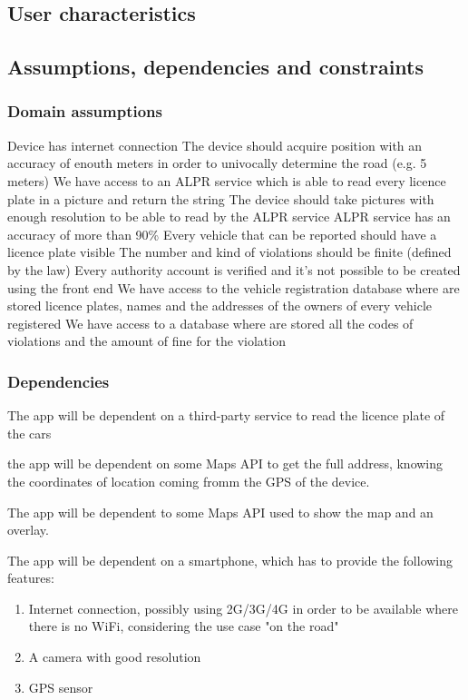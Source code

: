 \subsection{User characteristics }

\subsection{Assumptions, dependencies and constraints}
\subsubsection{Domain assumptions}

\begin{enumerate}
  Device has internet connection
 The device should acquire position with an accuracy of enouth meters in order to univocally determine the road (e.g. 5 meters)
\dom{} We have access to an ALPR service which is able to read every licence plate in a picture and return the string
 The device should take pictures with enough resolution to be able to read by the ALPR service
 ALPR service has an accuracy of more than 90\%
 Every vehicle that can be reported should have a licence plate visible
 The number and kind of violations should be finite (defined by the law)
 Every authority account is verified and it's not possible to be created using the front end
 We have access to the vehicle registration database where are stored licence plates, names and the addresses of the owners of every vehicle registered
 We have access to a database where are stored all the codes of violations and the amount of fine for the violation

\end{enumerate}

\subsubsection{Dependencies} \label{Dependencies}

The app will be dependent on a third-party service to read the licence plate of the cars

the app will be dependent on some Maps API to get the full address, knowing the coordinates of location coming fromm the GPS of the device.

The app will be dependent to some Maps API used to show the map and an overlay.



The app will be dependent on a smartphone, which has to provide the following features:
\begin{enumerate}
  \item Internet connection, possibly using 2G/3G/4G in order to be available where there is no WiFi, considering the use case "on the road"
  \item A camera with good resolution
  \item GPS sensor
\end{enumerate}
